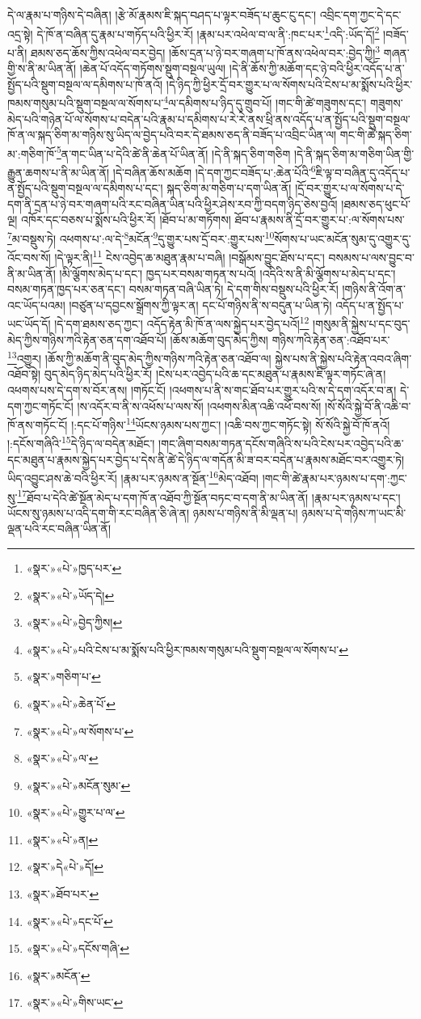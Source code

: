 དེ་ལ་རྣམ་པ་གཉིས་དེ་བཞིན། །རྩེ་མོ་རྣམས་ཇི་སྐད་བཤད་པ་ལྟར་བཟོད་པ་ཆུང་ངུ་དང་། འབྲིང་དག་ཀྱང་དེ་དང་འདྲ་སྟེ། དེ་ཁོ་ན་བཞིན་དུ་རྣམ་པ་གཏོད་པའི་ཕྱིར་རོ། །རྣམ་པར་འཕེལ་བ་ལ་ནི་:ཁང་པར་\footnote{«སྣར་»«པེ་»ཁྱད་པར་}འདི་:ཡོད་དོ།\footnote{«སྣར་»«པེ་»ཡོད་དེ།} །བཟོད་པ་ནི། ཐམས་ཅད་ཆོས་ཀྱིས་འཕེལ་བར་བྱེད། །ཆོས་དྲན་པ་ཉེ་བར་གཞག་པ་ཁོ་ནས་འཕེལ་བར་:བྱེད་ཀྱི།\footnote{«སྣར་»«པེ་»བྱེད་ཀྱིས།} གཞན་གྱི་ས་ནི་མ་ཡིན་ནོ། །ཆེན་པོ་འདོད་གཏོགས་སྡུག་བསྔལ་ཡུལ། །དེ་ནི་ཆོས་ཀྱི་མཆོག་དང་ཉེ་བའི་ཕྱིར་འདོད་པ་ན་སྤྱོད་པའི་སྡུག་བསྔལ་ལ་དམིགས་པ་ཁོ་ནའོ། །དེ་ཉིད་ཀྱི་ཕྱིར་དྲོ་བར་གྱུར་པ་ལ་སོགས་པའི་ངེས་པ་མ་སྨོས་པའི་ཕྱིར་ཁམས་གསུམ་པའི་སྡུག་བསྔལ་ལ་སོགས་པ་\footnote{«སྣར་»«པེ་»པའི་ངེས་པ་མ་སྨོས་པའི་ཕྱིར་ཁམས་གསུམ་པའི་སྡུག་བསྔལ་ལ་སོགས་པ་}ལ་དམིགས་པ་ཉིད་དུ་གྲུབ་པོ། །གང་གི་ཚེ་གཟུགས་དང་། གཟུགས་མེད་པའི་གཉེན་པོ་ལ་སོགས་པ་བདེན་པའི་རྣམ་པ་དམིགས་པ་རེ་རེ་ནས་ཕྲི་ནས་འདོད་པ་ན་སྤྱོད་པའི་སྡུག་བསྔལ་ཁོ་ན་ལ་སྐད་ཅིག་མ་གཉིས་སུ་ཡིད་ལ་བྱེད་པའི་བར་དེ་ཐམས་ཅད་ནི་བཟོད་པ་འབྲིང་ཡིན་ལ། གང་གི་ཚེ་སྐད་ཅིག་མ་:གཅིག་ཁོ་\footnote{«སྣར་»གཅིག་པ་}ན་གང་ཡིན་པ་དེའི་ཚེ་ནི་ཆེན་པོ་ཡིན་ནོ། །དེ་ནི་སྐད་ཅིག་གཅིག །དེ་ནི་སྐད་ཅིག་མ་གཅིག་ཡིན་གྱི་རྒྱུན་ཆགས་པ་ནི་མ་ཡིན་ནོ། །དེ་བཞིན་ཆོས་མཆོག །དེ་དག་ཀྱང་བཟོད་པ་:ཆེན་པོའི་\footnote{«སྣར་»«པེ་»ཆེན་པོ་}ཇི་ལྟ་བ་བཞིན་དུ་འདོད་པ་ན་སྤྱོད་པའི་སྡུག་བསྔལ་ལ་དམིགས་པ་དང་། སྐད་ཅིག་མ་གཅིག་པ་དག་ཡིན་ནོ། །དྲོ་བར་གྱུར་པ་ལ་སོགས་པ་དེ་དག་ནི་དྲན་པ་ཉེ་བར་གཞག་པའི་རང་བཞིན་ཡིན་པའི་ཕྱིར་ཤེས་རབ་ཀྱི་བདག་ཉིད་ཅེས་བྱའོ། །ཐམས་ཅད་ཕུང་པོ་ལྔ། འཁོར་དང་བཅས་པ་སྨོས་པའི་ཕྱིར་རོ། །ཐོབ་པ་མ་གཏོགས། ཐོབ་པ་རྣམས་ནི་དྲོ་བར་གྱུར་པ་:ལ་སོགས་པས་\footnote{«སྣར་»«པེ་»ལ་སོགས་པ་}མ་བསྡུས་ཏེ། འཕགས་པ་:ལ་དེ་\footnote{«སྣར་»«པེ་»ལ་}མངོན་\footnote{«སྣར་»«པེ་»མངོན་སུམ་}དུ་གྱུར་པས་དྲོ་བར་:གྱུར་པས་\footnote{«སྣར་»«པེ་»གྱུར་པ་ལ་}སོགས་པ་ཡང་མངོན་སུམ་དུ་འགྱུར་དུ་འོང་བས་སོ། །དེ་ལྟར་ནི།\footnote{«སྣར་»«པེ་»ན།} ངེས་འབྱེད་ཆ་མཐུན་རྣམ་པ་བཞི། །བསྒོམས་བྱུང་ཐོས་པ་དང་། བསམས་པ་ལས་བྱུང་བ་ནི་མ་ཡིན་ནོ། །མི་ལྕོགས་མེད་པ་དང་། ཁྱད་པར་བསམ་གཏན་ས་པའོ། །འདིའི་ས་ནི་མི་ལྕོགས་པ་མེད་པ་དང་། བསམ་གཏན་ཁྱད་པར་ཅན་དང་། བསམ་གཏན་བཞི་ཡིན་ཏེ། དེ་དག་གིས་བསྡུས་པའི་ཕྱིར་རོ། །གཉིས་ནི་འོག་ན་འང་ཡོད་པའམ། །བཙུན་པ་དབྱངས་སྒྲོགས་ཀྱི་ལྟར་ན། དང་པོ་གཉིས་ནི་ས་བདུན་པ་ཡིན་ཏེ། འདོད་པ་ན་སྤྱོད་པ་ཡང་ཡོད་དོ། །དེ་དག་ཐམས་ཅད་ཀྱང་། འདོད་རྟེན་མི་ཁོ་ན་ལས་སྐྱེད་པར་བྱེད་པའོ།\footnote{«སྣར་»དེ«པེ་»དོ།} །གསུམ་ནི་སྐྱེས་པ་དང་བུད་མེད་ཀྱིས་གཉིས་ཀའི་རྟེན་ཅན་དག་འཐོབ་པོ། །ཆོས་མཆོག་བུད་མེད་ཀྱིས། གཉིས་ཀའི་རྟེན་ཅན་:འཐོབ་པར་\footnote{«སྣར་»ཐོབ་པར་}འགྱུར། །ཆོས་ཀྱི་མཆོག་ནི་བུད་མེད་ཀྱིས་གཉིས་ཀའི་རྟེན་ཅན་འཐོབ་ལ། སྐྱེས་པས་ནི་སྐྱེས་པའི་རྟེན་འབའ་ཞིག་འཐོབ་སྟེ། བུད་མེད་ཉིད་མེད་པའི་ཕྱིར་རོ། །ངེས་པར་འབྱེད་པའི་ཆ་དང་མཐུན་པ་རྣམས་ཇི་ལྟར་གཏོང་ཞེ་ན། འཕགས་པས་དེ་དག་ས་བོར་ནས། །གཏོང་ངོ། །འཕགས་པ་ནི་ས་གང་ཐོབ་པར་གྱུར་པའི་ས་དེ་དག་འདོར་བ་ན། དེ་དག་ཀྱང་གཏོང་ངོ། །ས་འདོར་བ་ནི་ས་འཕོས་པ་ལས་སོ། །འཕགས་མིན་འཆི་འཕོ་བས་སོ། །སོ་སོའི་སྐྱེ་བོ་ནི་འཆི་བ་ཁོ་ནས་གཏོང་ངོ། །:དང་པོ་གཉིས་\footnote{«སྣར་»«པེ་»དང་པོ་}ཡོངས་ཉམས་པས་ཀྱང་། །འཆི་བས་ཀྱང་གཏོང་སྟེ། སོ་སོའི་སྐྱེ་བོ་ཁོ་ནའོ། །:དངོས་གཞིའི་\footnote{«སྣར་»«པེ་»དངོས་གཞི་}དེ་ཉིད་ལ་བདེན་མཐོང་། །གང་ཞིག་བསམ་གཏན་དངོས་གཞིའི་ས་པའི་ངེས་པར་འབྱེད་པའི་ཆ་དང་མཐུན་པ་རྣམས་སྐྱེད་པར་བྱེད་པ་དེས་ནི་ཚེ་དེ་ཉིད་ལ་གདོན་མི་ཟ་བར་བདེན་པ་རྣམས་མཐོང་བར་འགྱུར་ཏེ། ཡིད་འབྱུང་ཤས་ཆེ་བའི་ཕྱིར་རོ། །རྣམ་པར་ཉམས་ན་སྔོན་\footnote{«སྣར་»མངོན་}མེད་འཐོབ། །གང་གི་ཚེ་རྣམ་པར་ཉམས་པ་དག་:ཀྱང་སུ་\footnote{«སྣར་»«པེ་»གིས་ཡང་}ཐོབ་པ་དེའི་ཚེ་སྔོན་མེད་པ་དག་ཁོ་ན་འཐོབ་ཀྱི་སྔོན་བཏང་བ་དག་ནི་མ་ཡིན་ནོ། །རྣམ་པར་ཉམས་པ་དང་། ཡོངས་སུ་ཉམས་པ་འདི་དག་གི་རང་བཞིན་ཅི་ཞེ་ན། ཉམས་པ་གཉིས་ནི་མི་ལྡན་པ། ཉམས་པ་དེ་གཉིས་ཀ་ཡང་མི་ལྡན་པའི་རང་བཞིན་ཡིན་ནོ། 